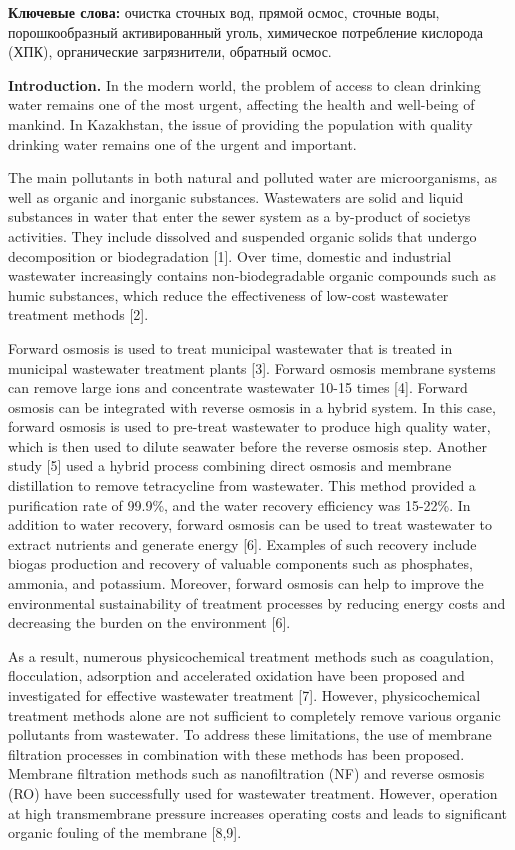 {\bfseries Ключевые слова:} очистка сточных вод, прямой осмос, сточные
воды, порошкообразный активированный уголь, химическое потребление
кислорода (ХПК), органические загрязнители, обратный осмос.

\begin{multicols}{2}
{\bfseries Introduction.} In the modern world, the problem of access to
clean drinking water remains one of the most urgent, affecting the
health and well-being of mankind. In Kazakhstan, the issue of providing
the population with quality drinking water remains one of the urgent and
important.

The main pollutants in both natural and polluted water are
microorganisms, as well as organic and inorganic substances. Wastewaters
are solid and liquid substances in water that enter the sewer system as
a by-product of society\textquotesingle s activities. They include
dissolved and suspended organic solids that undergo decomposition or
biodegradation {[}1{]}. Over time, domestic and industrial wastewater
increasingly contains non-biodegradable organic compounds such as humic
substances, which reduce the effectiveness of low-cost wastewater
treatment methods {[}2{]}.

Forward osmosis is used to treat municipal wastewater that is treated in
municipal wastewater treatment plants {[}3{]}. Forward osmosis membrane
systems can remove large ions and concentrate wastewater 10-15 times
{[}4{]}. Forward osmosis can be integrated with reverse osmosis in a
hybrid system. In this case, forward osmosis is used to pre-treat
wastewater to produce high quality water, which is then used to dilute
seawater before the reverse osmosis step. Another study {[}5{]} used a
hybrid process combining direct osmosis and membrane distillation to
remove tetracycline from wastewater. This method provided a purification
rate of 99.9\%, and the water recovery efficiency was 15-22\%. In
addition to water recovery, forward osmosis can be used to treat
wastewater to extract nutrients and generate energy {[}6{]}. Examples of
such recovery include biogas production and recovery of valuable
components such as phosphates, ammonia, and potassium. Moreover, forward
osmosis can help to improve the environmental sustainability of
treatment processes by reducing energy costs and decreasing the burden
on the environment {[}6{]}.

As a result, numerous physicochemical treatment methods such as
coagulation, flocculation, adsorption and accelerated oxidation have
been proposed and investigated for effective wastewater treatment
{[}7{]}. However, physicochemical treatment methods alone are not
sufficient to completely remove various organic pollutants from
wastewater. To address these limitations, the use of membrane filtration
processes in combination with these methods has been proposed. Membrane
filtration methods such as nanofiltration (NF) and reverse osmosis (RO)
have been successfully used for wastewater treatment. However, operation
at high transmembrane pressure increases operating costs and leads to
significant organic fouling of the membrane {[}8,9{]}.


\end{multicols}
